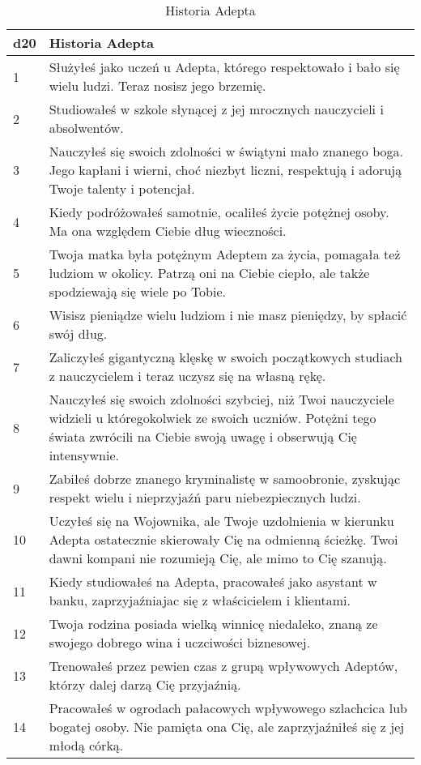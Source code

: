  \begin{table*}[t]
 \centering
 \begin{tabularx}{\textwidth}{| p{} | X |}
  \hline
  \textbf{d20} & \textbf{Historia Adepta}  \\ \hline
    1 & Służyłeś jako uczeń u Adepta, którego respektowało i bało się wielu ludzi. Teraz nosisz jego brzemię. \\ \hline
    2 & Studiowałeś w szkole słynącej z jej mrocznych nauczycieli i absolwentów. \\ \hline
    3 & Nauczyłeś się swoich zdolności w świątyni mało znanego boga. Jego kapłani i wierni, choć niezbyt liczni, respektują i adorują Twoje talenty i potencjał. \\ \hline
    4 & Kiedy podróżowałeś samotnie, ocaliłeś życie potężnej osoby. Ma ona względem Ciebie dług wieczności. \\ \hline
    5 & Twoja matka była potężnym Adeptem za życia, pomagała też ludziom w okolicy. Patrzą oni na Ciebie ciepło, ale także spodziewają się wiele po Tobie. \\ \hline
    6 & Wisisz pieniądze wielu ludziom i nie masz pieniędzy, by spłacić swój dług. \\ \hline
    7 & Zaliczyłeś gigantyczną klęskę w swoich początkowych studiach z nauczycielem i teraz uczysz się na własną rękę. \\ \hline
    8 & Nauczyłeś się swoich zdolności szybciej, niż Twoi nauczyciele widzieli u któregokolwiek ze swoich uczniów. Potężni tego świata zwrócili na Ciebie swoją uwagę i obserwują Cię intensywnie.  \\ \hline
    9 & Zabiłeś dobrze znanego kryminalistę w samoobronie, zyskując respekt wielu i nieprzyjaźń paru niebezpiecznych ludzi. \\ \hline
    10 & Uczyłeś się na Wojownika, ale Twoje uzdolnienia w kierunku Adepta ostatecznie skierowały Cię na odmienną ścieżkę. Twoi dawni kompani nie rozumieją Cię, ale mimo to Cię szanują. \\ \hline
    11 & Kiedy studiowałeś na Adepta, pracowałeś jako asystant w banku, zaprzyjaźniajac się z właścicielem i klientami. \\ \hline
    12 & Twoja rodzina posiada wielką winnicę niedaleko, znaną ze swojego dobrego wina i uczciwości biznesowej. \\ \hline
    13 & Trenowałeś przez pewien czas z grupą wpływowych Adeptów, którzy dalej darzą Cię przyjaźnią. \\ \hline
    14 & Pracowałeś w ogrodach pałacowych wpływowego szlachcica lub bogatej osoby. Nie pamięta ona Cię, ale zaprzyjaźniłeś się z jej młodą córką. \\ \hline
    
 \end{tabularx}
  \caption {Historia Adepta}
  \label {Historia Adepta}
 \end{table*}